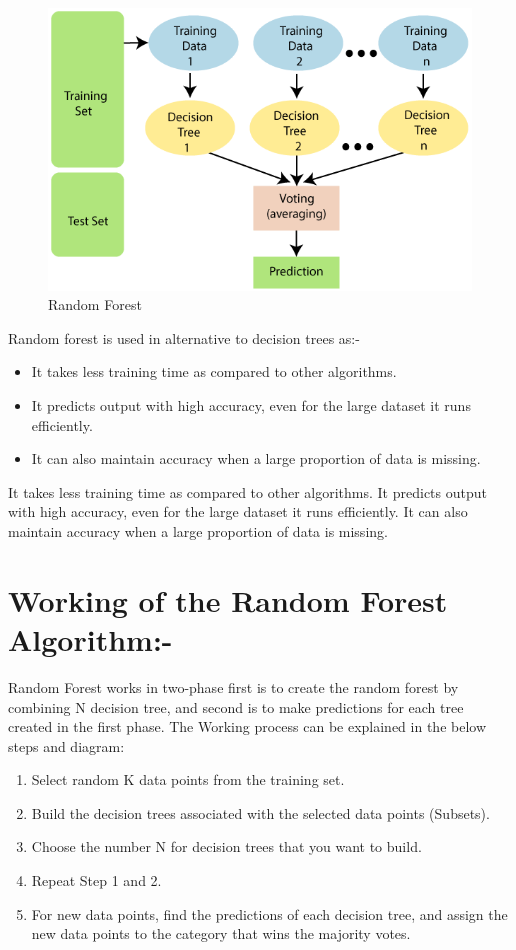 \documentclass[12pt,a4paper]{report}
\newenvironment{codedstep}[1][]
  {\begin{enumerate}[label=Step \arabic*:]}
  {\end{enumerate}}
\begin{document}
\begin{figure}[htbp]
    \centering
    \includegraphics[width=\textwidth]{random-forest-algorithm.png}
    \caption{Random Forest}
    \label{fig:Random-forest}
\end{figure}

\newpage
Random forest is used in alternative to decision trees as:-
\begin{itemize}
    \item It takes less training time as compared to other algorithms.
    \item It predicts output with high accuracy, even for the large dataset it runs efficiently.
    \item It can also maintain accuracy when a large proportion of data is missing.
\end{itemize}
It takes less training time as compared to other algorithms.
It predicts output with high accuracy, even for the large dataset it runs efficiently.
It can also maintain accuracy when a large proportion of data is missing.

\section{Working of the Random Forest Algorithm:-}
Random Forest works in two-phase first is to create the random forest by combining N decision tree, and second is to make predictions for each tree created in the first phase.
The Working process can be explained in the below steps and diagram:
\begin{codedstep}
 \item Select random K data points from the training set. \item Build the decision trees associated with the selected data points (Subsets).
 \item Choose the number N for decision trees that you want to build.
 \item Repeat Step 1 and 2.
 \item For new data points, find the predictions of each decision tree, and assign the new data points to the category that wins the majority votes.
\end{codedstep}
\end{document}
